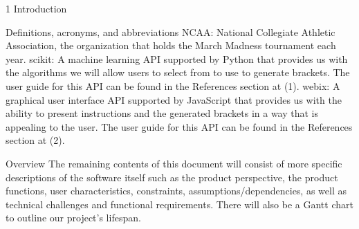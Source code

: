 \documentclass[letterpaper, 10pt,titlepage]{article}
\begin{document}
\begin{section}{1 Introduction}
\begin{subsection}{Definitions, acronyms, and abbreviations}
NCAA: National Collegiate Athletic Association, the organization that holds the March Madness tournament each year.
scikit: A machine learning API supported by Python that provides us with the algorithms we will allow users to select from to use to generate brackets. The user guide for this API can be found in the References section at (1).
webix: A graphical user interface API supported by JavaScript that provides us with the ability to present instructions and the generated brackets in a way that is appealing to the user. The user guide for this API can be found in the References section at (2).
\end{subsection}



\begin{subsection}{Overview}
The remaining contents of this document will consist of more specific descriptions of the software itself such as the product perspective, the product functions, user characteristics, constraints, assumptions/dependencies, as well as technical challenges and functional requirements. There will also be a Gantt chart to outline our project's lifespan.
\end{subsection}

\end{section}
\end{document}
